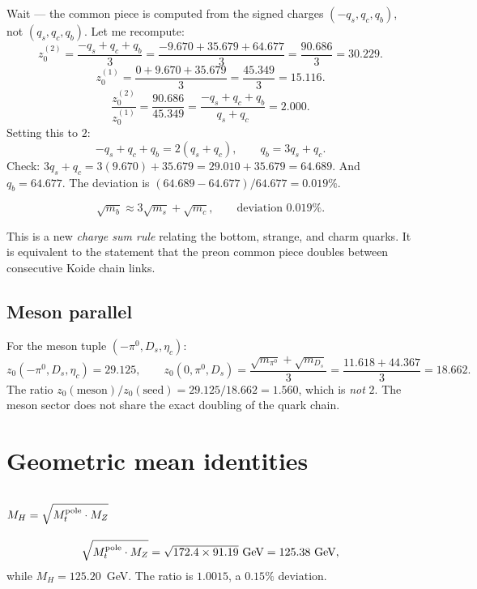 \documentclass[11pt]{article}
\begin{document}
Wait --- the common piece is computed from the signed charges
$(-q_s, q_c, q_b)$, not $(q_s, q_c, q_b)$. Let me recompute:
\[
  z_0^{(2)} = \frac{-q_s + q_c + q_b}{3}
  = \frac{-9.670 + 35.679 + 64.677}{3}
  = \frac{90.686}{3} = 30.229.
\]
\[
  z_0^{(1)} = \frac{0 + 9.670 + 35.679}{3}
  = \frac{45.349}{3} = 15.116.
\]
\[
  \frac{z_0^{(2)}}{z_0^{(1)}} = \frac{90.686}{45.349}
  = \frac{-q_s + q_c + q_b}{q_s + q_c} = 2.000.
\]
Setting this to $2$:
\[
  -q_s + q_c + q_b = 2(q_s + q_c),
  \qquad
  q_b = 3q_s + q_c.
\]
Check: $3q_s + q_c = 3(9.670) + 35.679 = 29.010 + 35.679 = 64.689$.
And $q_b = 64.677$.  The deviation is
$(64.689-64.677)/64.677 = 0.019\%$.

\begin{equation}
  \boxed{\sqrt{m_b} \approx 3\sqrt{m_s} + \sqrt{m_c},
  \qquad \text{deviation } 0.019\%.}
  \label{eq:charge-rule}
\end{equation}

This is a new \emph{charge sum rule} relating the bottom, strange,
and charm quarks.  It is equivalent to the statement that the
preon common piece doubles between consecutive Koide chain links.

\subsection{Meson parallel}

For the meson tuple $(-\pi^0,D_s,\eta_c)$:
\[
  z_0(-\pi^0,D_s,\eta_c) = 29.125,
  \qquad
  z_0(0,\pi^0,D_s) = \frac{\sqrt{m_{\pi^0}}+\sqrt{m_{D_s}}}{3}
  = \frac{11.618+44.367}{3} = 18.662.
\]
The ratio $z_0(\text{meson})/z_0(\text{seed}) = 29.125/18.662 = 1.560$,
which is \emph{not} $2$.  The meson sector does not share the
exact doubling of the quark chain.

\section{Geometric mean identities}

\subsection{$M_H = \sqrt{M_t^{\rm pole}\cdot M_Z}$}

\begin{equation}
  \sqrt{M_t^{\rm pole}\cdot M_Z}
  = \sqrt{172.4\times 91.19}~\text{GeV}
  = 125.38~\text{GeV},
\end{equation}
while $M_H = 125.20$~GeV.  The ratio is $1.0015$, a $0.15\%$
deviation.
\end{document}
